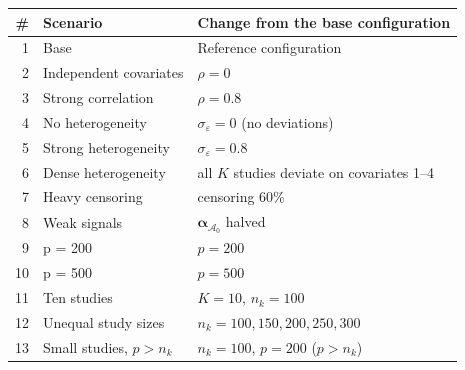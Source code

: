 \begin{tabular}{@{}rll@{}}
\toprule
\# & Scenario & Change from the base configuration \\
\midrule
1 & Base & Reference configuration \\
2 & Independent covariates & $\rho=0$ \\
3 & Strong correlation & $\rho=0.8$ \\
4 & No heterogeneity & $\sigma_\varepsilon=0$ (no deviations) \\
5 & Strong heterogeneity & $\sigma_\varepsilon=0.8$ \\
6 & Dense heterogeneity & all $K$ studies deviate on covariates 1--4 \\
7 & Heavy censoring & censoring $60\%$ \\
8 & Weak signals & $\boldsymbol\alpha_{\mathcal A_0}$ halved \\
9 & p = 200 & $p=200$ \\
10 & p = 500 & $p=500$ \\
11 & Ten studies & $K=10$, $n_k=100$ \\
12 & Unequal study sizes & $n_k=100,150,200,250,300$ \\
13 & Small studies, $p>n_k$ & $n_k=100$, $p=200$ ($p>n_k$) \\
\bottomrule
\end{tabular}
